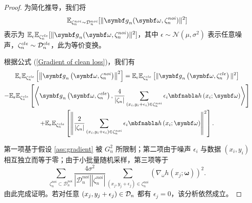 \begin{proof}
为简化推导，我们将
$$
\mathbb{E}_{\zetanoi_n\sim \Dnoi_n}[\Vert \gb_n(\omegab, \zetanoi_n) \Vert^2]
$$
表示为 $\mathbb{E}_\epsilon\mathbb{E}_{\zetacle_n}[\Vert \gb_n(\omegab, \zetanoi_n) \Vert^2]$，其中 $\epsilon\sim \mathcal{N}(\mu, \sigma^2)$ 表示任意噪声，$\zeta^{cle}_n\sim\mathcal{D}^{cle}_n$，此为等价变换。

根据公式 (\ref{Gradient of clean loss})，我们有
\begin{multline}\label{eq:proof-s1}
\mathbb{E}_\epsilon\mathbb{E}_{\zetacle_n}\left[\left\Vert \gb_n\left(\omegab, \zetanoi_n\right) \right\Vert^2\right] 
= \mathbb{E}_\epsilon\mathbb{E}_{\zetacle_n}\left[\Vert\gb_n\left(\omegab,\zetacle_n\right)\Vert^2\right] \\
-\mathbb{E}_\epsilon\mathbb{E}_{\zetacle_n}\left[\left\langle\gb_n\left(\omegab,\zetacle_n\right),\frac{4}{|\zeta_n|}\sum_{\left(x_i,y_i+\epsilon_i\right)\in \zetanoi_n}\epsilon_i\nabla h\left(x_{i};\omegab\right)\right\rangle\right]\\
+\mathbb{E}_\epsilon\mathbb{E}_{\zetacle_n}\left[\left\Vert \frac{2}{|\zeta_n|}\sum_{\left(x_i,y_i+\epsilon_i\right)\in \zetanoi_n}\epsilon_i\nabla h\left(x_{i};\omegab\right)\right\Vert^2\right].
\end{multline}

第一项基于假设 \ref{ass:gradient} 被 $G_n^2$ 所限制；第二项由于噪声 $\epsilon_i$ 与数据 $(x_i,y_i)$ 相互独立而等于零；由于小批量随机采样，第三项等于
$$
\sum_{\zeta_n^{noi}\subset\mathcal{D}_n^{noi}} \frac{4\sigma^2}{|\mathcal{D}_n^{noi}||\zeta_n^{noi}|}\sum_{\left(x_{j},y_{j}+\epsilon_{j}\right)\in \zeta_n^{noi}}\left(\nabla_\omega  h\left(x_{j};\boldsymbol{\omega}\right)\right)^2.
$$
由此完成证明。若对任意 $\left(x_j,y_j+\epsilon_j\right)\in\mathcal{D}_n$ 都有 $\epsilon_j=0$，该分析依然成立。
\end{proof}